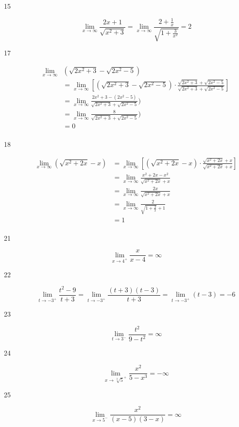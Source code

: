 \documentclass[fleqn]{exam}
\begin{document}
\begin{description}
\item[15]
\[
  \lim_{x \to \infty} \frac{2x + 1}{\sqrt{x^2 + 3}} = \lim_{x \to \infty} \frac{2 + \frac{1}{x}}{\sqrt{1 + \frac{3}{x^2}}} = 2
\]

\item[17]
\begin{align*}
  \lim_{x \to \infty} &\left( \sqrt{2x^2 + 3} - \sqrt{2x^2 - 5} \right) \\
  &= \lim_{x \to \infty} \left[ \left(\sqrt{2x^2 + 3} - \sqrt{2x^2 - 5} \right) \cdot \frac{\sqrt{2x^2 + 3} + \sqrt{2x^2 - 5}}{\sqrt{2x^2 + 3} + \sqrt{2x^2 - 5}} \right] \\
  &= \lim_{x \to \infty} \frac{2x^2 + 3 - (2x^2 - 5)}{\sqrt{2x^2 + 3} + \sqrt{2x^2 - 5}}) \\
  &= \lim_{x \to \infty} \frac{8}{\sqrt{2x^2 + 3} + \sqrt{2x^2 - 5}}) \\
  &= 0 \\
\end{align*}

\item[18]
\begin{align*}
  \lim_{x \to \infty} \left( \sqrt{x^2 + 2x} - x \right)
  &= \lim_{x \to \infty} \left[ \left(\sqrt{x^2 + 2x} - x \right) \cdot \frac{\sqrt{x^2 + 2x} + x}{\sqrt{x^2 + 2x} + x} \right] \\
  &= \lim_{x \to \infty} \frac{x^2 + 2x - x^2}{\sqrt{x^2 + 2x} + x} \\
  &= \lim_{x \to \infty} \frac{2x}{\sqrt{x^2 + 2x} + x} \\
  &= \lim_{x \to \infty} \frac{2}{\sqrt{1 + \frac{2}{x}} + 1} \\
  &= 1 \\
\end{align*}

\item[21]
\[
  \lim_{x \to 4^+} \frac{x}{x - 4} = \infty
\]

\item[22]
\[
  \lim_{t \to -3^+} \frac{t^2 - 9}{t + 3} = \lim_{t \to -3^+} \frac{(t + 3)(t - 3)}{t + 3} = \lim_{t \to -3^+} (t - 3) = -6
\]

\item[23]
\[
  \lim_{t \to 3^-} \frac{t^2}{9 - t^2} = \infty
\]

\item[24]
\[
  \lim_{x \to \sqrt[3]{5}^+} \frac{x^2}{5 - x^3} = -\infty
\]

\item[25]
\[
  \lim_{x \to 5^-} \frac{x^2}{(x - 5)(3 - x)} = \infty
\]


\end{description}
\end{document}
